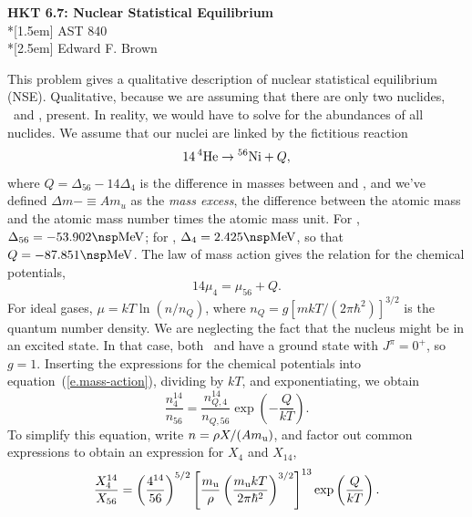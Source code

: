 \documentclass[11pt]{article}
\begin{document}
\newcommand{\thetitle}{HKT 6.7: Nuclear Statistical Equilibrium}
\newcommand{\thecourse}{AST 840}
\newcommand{\theauthor}{Edward F. Brown}

\begin{titlepage}
\begin{center}
\LARGE{\textbf{\thetitle}}\\*[1.5em]
\Large{\thecourse}\\*[2.5em]
\large{\theauthor}
\end{center}
\end{titlepage}

This problem gives a qualitative description of nuclear statistical equilibrium (NSE).  Qualitative, because we are assuming that there are only two nuclides, \helium\ and \nickel[56], present. In reality, we would have to solve for the abundances of all nuclides.  We assume that our nuclei are linked by the fictitious reaction
\begin{equation}\label{e.chem}
14\,\helium \to \nickel[56] + Q,
\end{equation}
where $Q = \Delta_{56} - 14\Delta_{4}$ is the difference in masses between \nickel[56] and \helium, and we've defined $\Delta m - \equiv A m_{u}$ as the \emph{mass excess}, the difference between the atomic mass and the atomic mass number times the atomic mass unit.  For \nickel[56], $\Delta_{56} = -53.902\nsp\MeV$; for \helium, $\Delta_{4} = 2.425\nsp\MeV$, so that $Q = -87.851\nsp\MeV$. The law of mass action gives the relation for the chemical potentials,
\begin{equation}\label{e.mass-action}
14\mu_{4} = \mu_{56} + Q.
\end{equation}
For ideal gases, $\mu = kT\ln(n/n_{Q})$, where $n_{Q}=g[mkT/(2\pi\hbar^{2})]^{3/2}$ is the quantum number density.  We are neglecting the fact that the nucleus might be in an excited state. In that case, both \helium\ and \nickel[56] have a ground state with $J^{\pi} = 0^{+}$, so $g = 1$.  Inserting the expressions for the chemical potentials into equation~(\ref{e.mass-action}), dividing by $kT$, and exponentiating, we obtain
\begin{equation}\label{e.nse-1}
\frac{n_{4}^{14}}{n_{56}} = \frac{n_{Q,4}^{14}}{n_{Q,56}} \exp\left(-\frac{Q}{kT}\right).
\end{equation}
To simplify this equation, write $n = \rho X/(A\mb)$, and factor out common expressions to obtain an expression for $X_{4}$ and $X_{14}$,
\begin{equation}\label{e.nse-2}
\frac{X_{4}^{14}}{X_{56}} = \left(\frac{4^{14}}{56}\right)^{5/2}\left[\frac{\mb}{\rho}\left(\frac{\mb kT}{2\pi\hbar^{2}}\right)^{3/2}\right]^{13}\exp\left(\frac{Q}{kT}\right).
\end{equation}
\end{document}
